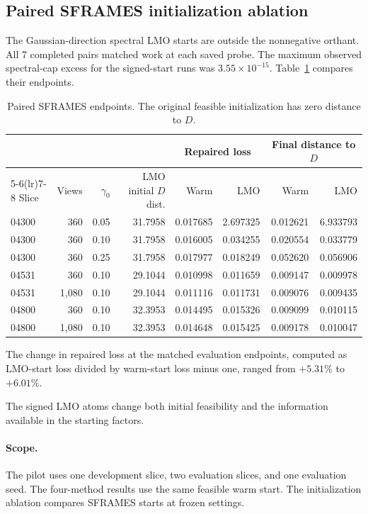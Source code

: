 \documentclass[11pt]{article}
\begin{document}
\subsection{Paired SFRAMES initialization ablation}

The Gaussian-direction spectral LMO starts are outside the nonnegative orthant. All 7 completed pairs matched work at each saved probe. The maximum observed spectral-cap excess for the signed-start runs was \(3.55\times 10^{-15}\). Table~\ref{tab:lmo-start} compares their endpoints.

\begin{table}[htbp]
\centering
\caption{Paired SFRAMES endpoints. The original feasible initialization has zero distance to \(D\).}
\label{tab:lmo-start}
\small
\begin{tabular}{@{}lrrrrrrr@{}}
\toprule
 & & & & \multicolumn{2}{c}{Repaired loss} & \multicolumn{2}{c}{Final distance to \(D\)} \\
\cmidrule(lr){5-6}\cmidrule(lr){7-8}
Slice & Views & \(\gamma_0\) & LMO initial \(D\) dist. & Warm & LMO & Warm & LMO \\
\midrule
04300 & 360 & 0.05 & 31.7958 & 0.017685 & 2.697325 & 0.012621 & 6.933793 \\
04300 & 360 & 0.10 & 31.7958 & 0.016005 & 0.034255 & 0.020554 & 0.033779 \\
04300 & 360 & 0.25 & 31.7958 & 0.017977 & 0.018249 & 0.052620 & 0.056906 \\
04531 & 360 & 0.10 & 29.1044 & 0.010998 & 0.011659 & 0.009147 & 0.009978 \\
04531 & 1,080 & 0.10 & 29.1044 & 0.011116 & 0.011731 & 0.009076 & 0.009435 \\
04800 & 360 & 0.10 & 32.3953 & 0.014495 & 0.015326 & 0.009099 & 0.010115 \\
04800 & 1,080 & 0.10 & 32.3953 & 0.014648 & 0.015425 & 0.009178 & 0.010047 \\
\bottomrule
\end{tabular}
\end{table}

The change in repaired loss at the matched evaluation endpoints, computed as LMO-start loss divided by warm-start loss minus one, ranged from \(+5.31\%\) to \(+6.01\%\).

The signed LMO atoms change both initial feasibility and the information available in the starting factors.

\paragraph{Scope.} The pilot uses one development slice, two evaluation slices, and one evaluation seed. The four-method results use the same feasible warm start. The initialization ablation compares SFRAMES starts at frozen settings.
\end{document}
